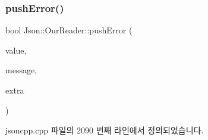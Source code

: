 \subsubsection{\texorpdfstring{push\+Error()}{pushError()}\hspace{0.1cm}{\footnotesize\ttfamily [2/2]}}
{\footnotesize\ttfamily bool Json\+::\+Our\+Reader\+::push\+Error (\begin{DoxyParamCaption}\item[{const \hyperlink{class_json_1_1_value}{Value} \&}]{value,  }\item[{const \hyperlink{json_8h_a1e723f95759de062585bc4a8fd3fa4be}{J\+S\+O\+N\+C\+P\+P\+\_\+\+S\+T\+R\+I\+NG} \&}]{message,  }\item[{const \hyperlink{class_json_1_1_value}{Value} \&}]{extra }\end{DoxyParamCaption})}



jsoncpp.\+cpp 파일의 2090 번째 라인에서 정의되었습니다.


